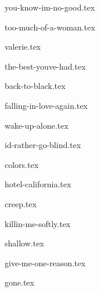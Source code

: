 \begin{songs}{}

  {you-know-im-no-good.tex}
  \sclearpage

  {too-much-of-a-woman.tex}
  \sclearpage

  {valerie.tex}
  \sclearpage
  
  {the-best-youve-had.tex}
  \sclearpage
  
  {back-to-black.tex}
  \sclearpage
    
  {falling-in-love-again.tex}  
  \sclearpage

  {wake-up-alone.tex}
  \sclearpage

  {id-rather-go-blind.tex}  
  \sclearpage

  {colors.tex}
  \sclearpage
  
  {hotel-california.tex}
  \sclearpage

  {creep.tex}
  \sclearpage
      
  {killin-me-softly.tex}
  \sclearpage
  
  {shallow.tex}
  \sclearpage
  
  {give-me-one-reason.tex}
  \sclearpage
  
  {gone.tex}
  \sclearpage

 \end{songs}
